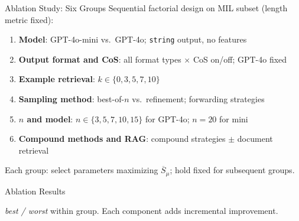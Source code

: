 \documentclass{beamer}
\begin{document}
\begin{frame}{Ablation Study: Six Groups}
\vspace{0.2em}
Sequential factorial design on MIL subset (length metric fixed):
\vspace{0.1em}
\begin{enumerate}\setlength{\itemsep}{2pt}
  \item \textbf{Model}: GPT-4o-mini vs.\ GPT-4o; \texttt{string} output, no features
  \item \textbf{Output format and CoS}: all format types $\times$ CoS on/off; GPT-4o fixed
  \item \textbf{Example retrieval}: $k \in \{0, 3, 5, 7, 10\}$
  \item \textbf{Sampling method}: best-of-$n$ vs.\ refinement; forwarding strategies
  \item \textbf{$n$ and model}: $n \in \{3, 5, 7, 10, 15\}$ for GPT-4o; $n=20$ for mini
  \item \textbf{Compound methods and RAG}: compound strategies $\pm$ document retrieval
\end{enumerate}
\vspace{0.1em}
\small Each group: select parameters maximizing $\overline{S}_\mu$; hold fixed for subsequent groups.
\end{frame}

\begin{frame}{Ablation Results}
\vspace{0.3em}
\begin{center}
\end{center}
\vspace{0.3em}
\begin{minipage}{\textwidth}\small \emph{best / worst} within group. Each component adds incremental improvement.\end{minipage}
\end{frame}
\end{document}
